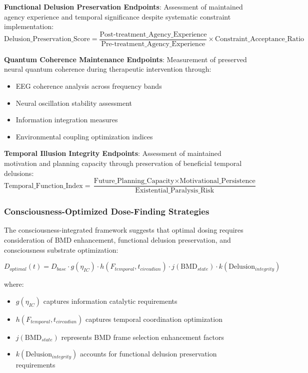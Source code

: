 \documentclass[12pt,a4paper]{article}
\begin{document}
\textbf{Functional Delusion Preservation Endpoints}:
Assessment of maintained agency experience and temporal significance despite systematic constraint implementation:
$$\text{Delusion\_Preservation\_Score} = \frac{\text{Post-treatment\_Agency\_Experience}}{\text{Pre-treatment\_Agency\_Experience}} \times \text{Constraint\_Acceptance\_Ratio}$$

\textbf{Quantum Coherence Maintenance Endpoints}:
Measurement of preserved neural quantum coherence during therapeutic intervention through:
\begin{itemize}
\item EEG coherence analysis across frequency bands
\item Neural oscillation stability assessment
\item Information integration measures
\item Environmental coupling optimization indices
\end{itemize}

\textbf{Temporal Illusion Integrity Endpoints}:
Assessment of maintained motivation and planning capacity through preservation of beneficial temporal delusions:
$$\text{Temporal\_Function\_Index} = \frac{\text{Future\_Planning\_Capacity} \times \text{Motivational\_Persistence}}{\text{Existential\_Paralysis\_Risk}}$$

\subsubsection{Consciousness-Optimized Dose-Finding Strategies}

The consciousness-integrated framework suggests that optimal dosing requires consideration of BMD enhancement, functional delusion preservation, and consciousness substrate optimization:

$$D_{optimal}(t) = D_{base} \cdot g(\eta_{IC}) \cdot h(F_{temporal}, t_{circadian}) \cdot j(\text{BMD}_{state}) \cdot k(\text{Delusion}_{integrity})$$

where:
\begin{itemize}
\item $g(\eta_{IC})$ captures information catalytic requirements
\item $h(F_{temporal}, t_{circadian})$ captures temporal coordination optimization
\item $j(\text{BMD}_{state})$ represents BMD frame selection enhancement factors
\item $k(\text{Delusion}_{integrity})$ accounts for functional delusion preservation requirements
\end{itemize}
\end{document}
